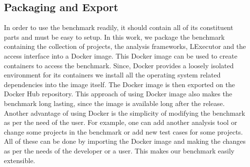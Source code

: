 \subsection{Packaging and Export}
\label{approach:packing and exporting}
In order to use the benchmark readily, it should contain all of its constituent parts and must be easy to setup.
In this work, we package the benchmark containing the collection of projects, the analysis frameworks, LExecutor and the access interface into a Docker \cite{Docker_2022} image.
This Docker image can be used to create containers to access the benchmark.  
Since, Docker provides a loosely isolated environment for its containers we install all the operating system related dependencies into the image itself.
The Docker image is then exported on the Docker Hub \cite{docker_hub} repository.
This approach of using Docker image also makes the benchmark long lasting, since the image is available long after the release.
Another advantage of using Docker is the simplicity of modifying the benchmark as per the need of the user.
For example, one can add another analysis tool or change some projects in the benchmark or add new test cases for some projects.
All of these can be done by importing the Docker image and making the changes as per the needs of the developer or a user.
This makes our benchmark easily extensible.